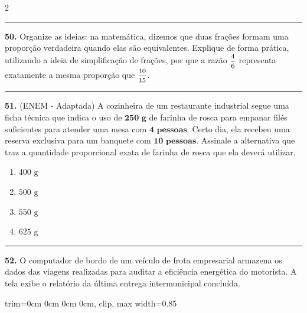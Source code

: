 \documentclass[twoside, 10pt, a4paper]{article}
\newlength{\espacoPreQuestao}\setlength{\espacoPreQuestao}{0.1cm}
\newlength{\espacoQuestao}\setlength{\espacoQuestao}{0.2cm}
\newcommand{\larguraTikz}{0.85\linewidth}
\begin{document}
\begin{multicols*}{2}
\noindent\textcolor{CorLinha}{\rule{\linewidth}{0.5pt}} 
\par\vspace{\espacoPreQuestao}
\textbf{50.} Organize as ideias: na matemática, dizemos que duas frações formam uma proporção verdadeira quando elas são equivalentes. Explique de forma prática, utilizando a ideia de simplificação de frações, por que a razão $ \mfrac{4}{6} $ representa exatamente a mesma proporção que $ \mfrac{10}{15} $.
\par\vspace{\espacoQuestao}

\noindent\textcolor{CorLinha}{\rule{\linewidth}{0.5pt}} 
\par\vspace{\espacoPreQuestao}
\textbf{51.} (ENEM - Adaptada) A cozinheira de um restaurante industrial segue uma ficha técnica que indica o uso de $ \textbf{250 g} $ de farinha de rosca para empanar filés suficientes para atender uma mesa com $ \textbf{4 pessoas} $. Certo dia, ela recebeu uma reserva exclusiva para um banquete com $ \textbf{10 pessoas} $. Assinale a alternativa que traz a quantidade proporcional exata de farinha de rosca que ela deverá utilizar.
\begin{enumerate}[label=\alph*)]
    \item $ 400 \text{ g} $
    \item $ 500 \text{ g} $
    \item $ 550 \text{ g} $
    \item $ 625 \text{ g} $
\end{enumerate}
\par\vspace{\espacoQuestao}

\noindent\textcolor{CorLinha}{\rule{\linewidth}{0.5pt}} 
\par\vspace{\espacoPreQuestao}
\textbf{52.} O computador de bordo de um veículo de frota empresarial armazena os dados das viagens realizadas para auditar a eficiência energética do motorista. A tela exibe o relatório da última entrega intermunicipal concluída.
\begin{center}
\begin{adjustbox}{trim=0cm 0cm 0cm 0cm, clip, max width=\larguraTikz}
\end{adjustbox}
\end{center}
\end{multicols*}
\end{document}
